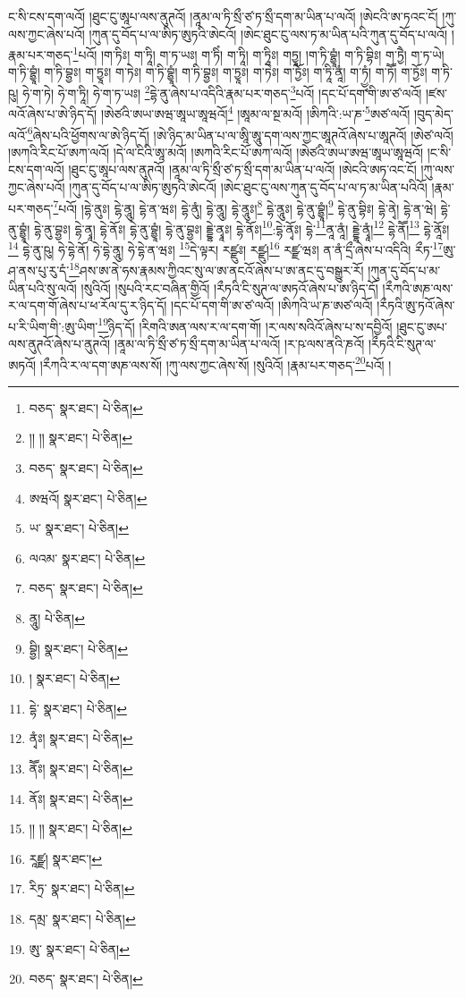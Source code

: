 ང་སི་ངས་དག་ལའོ། །ཐུང་ངུ་ཨཱཔ་ལས་ནུཊའོ། །ནཱམ་ལ་ཏི་སྲྀ་ཙ་ཏ་སྲྀ་དག་མ་ཡིན་པ་ལའོ། །ཨེངའི་ཨ་ཏའང་ངོ། །ཀུ་ལས་ཀྱང་ཞེས་པའོ། །ཀུན་དུ་བོད་པ་ལ་ཨིཏ་ཨུཏའི་ཨེངའོ། །ཨེང་ཐུང་ངུ་ལས་ཏ་མ་ཡིན་པའི་ཀུན་དུ་བོད་པ་ལའོ། །རྣམ་པར་གཅད་\footnote{བཅད་  སྣར་ཐང་།  པེ་ཅིན། }པའོ། །ག་ཏིཿ། ག་ཏཱི། ག་ཏ་ཡཿ། ག་ཏིཾ། ག་ཏཱི། ག་ཏཱིཿ། གཏྱཱ། །ག་ཏི་བྷྱཱཾ། ག་ཏི་བྷིཿ། ག་ཏྱཻ། ག་ཏ་ཡེ། ག་ཏི་བྷྱཱཾ། ག་ཏི་བྷྱཿ། ག་ཏྱཱཿ། ག་ཏེཿ། ག་ཏི་བྷྱཱཾ། ག་ཏི་བྷྱཿ། ག་ཏྱཱཿ། ག་ཏེཿ། ག་ཏྱོཿ། ག་ཏཱི་ནཱཾ། ག་ཏྱྭཾ། ག་ཏཽ། ག་ཏྱོཿ། ག་ཏི་ཥུ། ཧེ་ག་ཏེ། ཧེ་ག་ཏཱི། ཧེ་ག་ཏ་ཡཿ། \footnote{།། །།   སྣར་ཐང་།  པེ་ཅིན། }དྷེ་ནུ་ཞེས་པ་འདིའི་རྣམ་པར་གཅད་\footnote{བཅད་  སྣར་ཐང་།  པེ་ཅིན། }པའོ། །དང་པོ་དག་གི་ཨ་ཙ་ལའོ། །ཛས་ལའོ་ཞེས་པ་ཨེ་ཉིད་དོ། །ཨེཙའི་ཨཡ་ཨཝ་ཨཱཡ་ཨཱཝའོ།\footnote{ཨཝའོ།  སྣར་ཐང་།  པེ་ཅིན། } །ཨཱམ་ལ་སྔ་མའོ། །ཨིཀའི་:ཡ་ཎ་\footnote{ཡ་  སྣར་ཐང་།  པེ་ཅིན། }ཨཙ་ལའོ། །བུད་མེད་ལའོ་\footnote{ལའམ་  སྣར་ཐང་།  པེ་ཅིན། }ཞེས་པའི་ཕྱོགས་ལ་ཨེ་ཉིད་དོ། །ཨེ་ཉིད་མ་ཡིན་པ་ལ་ཨཱི་ཨཱུ་དག་ལས་ཀྱང་ཨཱཊའོ་ཞེས་པ་ཨཱཊའོ། །ཨེཙ་ལའོ། །ཨཀའི་རིང་པོ་ཨཀ་ལའོ། །དེ་ལ་ངིའི་ཨཱ་མའོ། །ཨཀའི་རིང་པོ་ཨཀ་ལའོ། །ཨེཙའི་ཨཡ་ཨཝ་ཨཱཡ་ཨཱཝའོ། །ང་སི་ངས་དག་ལའོ། །ཐུང་ངུ་ཨཱཔ་ལས་ནུཊའོ། །ནཱམ་ལ་ཏི་སྲྀ་ཙ་ཏ་སྲྀ་དག་མ་ཡིན་པ་ལའོ། །ཨེངའི་ཨཏ་འང་ངོ། །ཀུ་ལས་ཀྱང་ཞེས་པའོ། །ཀུན་དུ་བོད་པ་ལ་ཨིཏ་ཨུཏའི་ཨེངའོ། །ཨེང་ཐུང་ངུ་ལས་ཀུན་དུ་བོད་པ་ལ་ཏ་མ་ཡིན་པའིའོ། །རྣམ་པར་གཅད་\footnote{བཅད་  སྣར་ཐང་།  པེ་ཅིན། }པའོ། །དྷེ་ནུཿ། ངྷེ་ནཱུ། དྷེ་ན་ཝཿ། དྷེ་ནུཾ། དྷེ་ནཱུ། དྷེ་ནཱུཿ།\footnote{ནཱུ།  པེ་ཅིན། } དྷེ་ནཱུཿ། དྷེ་ནུ་བྷྱཱཾ།\footnote{བྷྱི།  སྣར་ཐང་།  པེ་ཅིན། } དྷེ་ནུ་བྷིཿ། དྷེ་ནྭེ། དྷེ་ན་ཝེ། དྷེ་ནུ་བྷྱཱཾ། དྷེ་ནུ་བྷྱཿ། དྷེ་ནྭཱ། དྷེ་ནོཿ། དྷེ་ནུ་བྷྱཱཾ། དྷེ་ནུ་བྷྱཿ། དྡྷེ་ནྭཱཿ། དྷེ་ནོཿ།\footnote{།   སྣར་ཐང་།  པེ་ཅིན། }:དྷེ་ནྭོཿ། དྷེ་\footnote{དྷེ་  སྣར་ཐང་།  པེ་ཅིན། }ནཱ་ནཱཾ། དྡྷེ་ནྭཱཾ།\footnote{ནྭཾཿ།  སྣར་ཐང་།  པེ་ཅིན། } དྷེ་ནཽ།\footnote{ནཽཿ།  སྣར་ཐང་།  པེ་ཅིན། } དྷེ་ནཱོཿ།\footnote{ནོཿ།  སྣར་ཐང་།  པེ་ཅིན། } དྷེ་ནུ་ཥུ། ཧེ་དྷེ་ནོ། ཧེ་དྷེ་ནཱུ། ཧེ་དྷེ་ན་ཝཿ། \footnote{།། །།   སྣར་ཐང་།  པེ་ཅིན། }དེ་ལྟར། རཛྫུཿ། རཛྫུ།\footnote{རཱཛྫ།  སྣར་ཐང་། } རཛྫ་ཝཿ། ན་ནཾ་དྲྀ་ཞེས་པ་འདིའི། རྀཏ་\footnote{རིཏྲ་  སྣར་ཐང་།  པེ་ཅིན། }ཨུ་ཤ་ནས་པུ་རུ་དཾ་\footnote{དམྲ་  སྣར་ཐང་།  པེ་ཅིན། }ཤས་ཨ་ནེ་ཧས་རྣམས་ཀྱིའང་སུ་ལ་ཨ་ནངའོ་ཞེས་པ་ཨ་ནང་དུ་བསྒྱུར་རོ། །ཀུན་དུ་བོད་པ་མ་ཡིན་པའི་སུ་ལའོ། །སུའིའོ། །སུཔའི་རང་བཞིན་གྱིའོ། །རྀཏའི་ངི་སུཊ་ལ་ཨཏའོ་ཞེས་པ་ཨ་ཉིད་དོ། །རྀཀའི་ཨཎ་ལས་ར་ལ་དག་གོ་ཞེས་པ་ཕ་རོལ་དུ་ར་ཉིད་དོ། །དང་པོ་དག་གི་ཨ་ཙ་ལའོ། །ཨིཀའི་ཡ་ཎ་ཨཙ་ལའོ། །རྀཏའི་ཨུ་ཏའོ་ཞེས་པ་རི་ཡིག་གི་:ཨུ་ཡིག་\footnote{ཨུ་  སྣར་ཐང་།  པེ་ཅིན། }ཉིད་དོ། །རིགའི་ཨན་ལས་ར་ལ་དག་གོ། །ར་ལས་སའིའོ་ཞེས་པ་ས་དབྱིའོ། །ཐུང་ངུ་ཨཔ་ལས་ནུཊའོ་ཞེས་པ་ནུཊའོ། །ནཱམ་ལ་ཏི་སྲྀ་ཙ་ཏ་སྲྀ་དག་མ་ཡིན་པ་ལའོ། །ར་ཥ་ལས་ནའི་ཎའོ། །རྀཏའི་ངི་སུཊ་ལ་ཨཏའོ། །རྀཀའི་ར་ལ་དག་ཨཎ་ལས་སོ། །ཀུ་ལས་ཀྱང་ཞེས་སོ། །སུའིའོ། །རྣམ་པར་གཅད་\footnote{བཅད་  སྣར་ཐང་།  པེ་ཅིན། }པའོ། །
